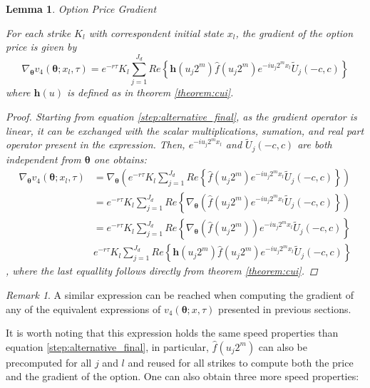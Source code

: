 \documentclass[12,twoside]{mammeTFM}
\newtheorem{lem}[thm]{Lemma}
\theoremstyle{definition}
\theoremstyle{remark}
\newtheorem{remark}[thm]{Remark}
\begin{document}
\begin{lem} Option Price Gradient

For each strike $K_l$ with correspondent initial state $x_l$, the gradient of the option price is given by
\begin{equation}
\nabla_{\boldsymbol{\theta}} v_4(\boldsymbol{\theta}; x_l, \tau) = 
e^{-r\tau} K_l \sum_{j=1}^{J_d} Re \left\{ \boldsymbol{h}(u_j 2^m) \hat{f}(u_j 2^m) e^{-i u_j 2^m x_l} \tilde{U}_j(-c,c) \right\}
\end{equation}
where $\boldsymbol{h}(u)$ is defined as in theorem \ref{theorem:cui}.
\begin{proof}
Starting from equation \ref{step:alternative_final}, as the gradient operator is linear, it can be exchanged with the scalar multiplications, sumation, and real part operator present in the expression. Then, $e^{-i u_j 2^m x_l}$ and $\tilde{U}_j(-c,c)$ are both independent from $\boldsymbol{\theta}$ one obtains:
\begin{equation}
\begin{aligned}
\nabla_{\boldsymbol{\theta}}v_4(\boldsymbol{\theta}; x_l, \tau) &= \nabla_{\boldsymbol{\theta}} \left(e^{-r\tau}K_l \sum_{j=1}^{J_d} Re \left\{ \hat{f}(u_j 2^m) e^{-i u_j 2^m x_l} \tilde{U}_j(-c,c) \right\} \right)\\
&= e^{-r\tau}K_l \sum_{j=1}^{J_d} Re \left\{ \nabla_{\boldsymbol{\theta}} \left(\hat{f}(u_j 2^m) e^{-i u_j 2^m x_l} \tilde{U}_j(-c,c) \right\} \right)\\
&= e^{-r\tau}K_l \sum_{j=1}^{J_d} Re \left\{ \nabla_{\boldsymbol{\theta}} \left(\hat{f}(u_j 2^m) \right) e^{-i u_j 2^m x_l} \tilde{U}_j(-c,c) \right\} \\
& e^{-r\tau} K_l \sum_{j=1}^{J_d} Re \left\{ \boldsymbol{h}(u_j 2^m) \hat{f}(u_j 2^m) e^{-i u_j 2^m x_l} \tilde{U}_j(-c,c) \right\}
\end{aligned}
\end{equation}
, where the last equallity follows directly from theorem \ref{theorem:cui}.
\end{proof}
\end{lem}

\begin{remark}
A similar expression can be reached when computing the gradient of any of the equivalent expressions of $v_4(\boldsymbol{\theta}; x, \tau)$ presented in previous sections. 
\end{remark}

It is worth noting that this expression holds the same speed properties than equation \ref{step:alternative_final}, in particular, $\hat{f}(u_j 2^m)$ can also be precomputed for all $j$ and $l$ and reused for all strikes to compute both the price and the gradient of the option. One can also obtain three more speed properties:
\end{document}
